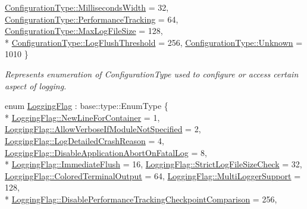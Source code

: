 \begin{DoxyCompactItemize}
\hyperlink{a00183_a281f5db6d6163678bc68a8b23b59e124a052bf0f0c813b3c41c5b5046ebc26529}{Configuration\+Type\+::\+Milliseconds\+Width} = 32, 
\hyperlink{a00183_a281f5db6d6163678bc68a8b23b59e124abe9e43d200c5698cb8519daed7035874}{Configuration\+Type\+::\+Performance\+Tracking} = 64, 
\hyperlink{a00183_a281f5db6d6163678bc68a8b23b59e124a4b35e615142d60db6383426f051e700b}{Configuration\+Type\+::\+Max\+Log\+File\+Size} = 128, 
\\*
\hyperlink{a00183_a281f5db6d6163678bc68a8b23b59e124ac1b4aae5c168e64292c9aa87a124ae86}{Configuration\+Type\+::\+Log\+Flush\+Threshold} = 256, 
\hyperlink{a00183_a281f5db6d6163678bc68a8b23b59e124a88183b946cc5f0e8c96b2e66e1c74a7e}{Configuration\+Type\+::\+Unknown} = 1010
 \}
\begin{DoxyCompactList}\small\item\em Represents enumeration of Configuration\+Type used to configure or access certain aspect of logging. \end{DoxyCompactList}\item 
enum \hyperlink{a00183_a2784aacd04cb7816ac1c0b20fcbf83cb}{Logging\+Flag} \+: base\+::type\+::\+Enum\+Type \{ \\*
\hyperlink{a00183_a2784aacd04cb7816ac1c0b20fcbf83cba8246f93d9afd63f87632d2d718cabca8}{Logging\+Flag\+::\+New\+Line\+For\+Container} = 1, 
\hyperlink{a00183_a2784aacd04cb7816ac1c0b20fcbf83cbac80d746c4296fe8e99ed032f5ffef31e}{Logging\+Flag\+::\+Allow\+Verbose\+If\+Module\+Not\+Specified} = 2, 
\hyperlink{a00183_a2784aacd04cb7816ac1c0b20fcbf83cba81ac37ef3ee37a01bf853be6abeb4ede}{Logging\+Flag\+::\+Log\+Detailed\+Crash\+Reason} = 4, 
\hyperlink{a00183_a2784aacd04cb7816ac1c0b20fcbf83cba8dd9782f8a19cf7a41e4ec38d1c6a4ae}{Logging\+Flag\+::\+Disable\+Application\+Abort\+On\+Fatal\+Log} = 8, 
\\*
\hyperlink{a00183_a2784aacd04cb7816ac1c0b20fcbf83cba7817e369fa619155822043e76ef88c7c}{Logging\+Flag\+::\+Immediate\+Flush} = 16, 
\hyperlink{a00183_a2784aacd04cb7816ac1c0b20fcbf83cba8496303f20ab09751ff3ec8802b187f5}{Logging\+Flag\+::\+Strict\+Log\+File\+Size\+Check} = 32, 
\hyperlink{a00183_a2784aacd04cb7816ac1c0b20fcbf83cbaeececaef2fc38e4f3c91f9f6b6fb6d49}{Logging\+Flag\+::\+Colored\+Terminal\+Output} = 64, 
\hyperlink{a00183_a2784aacd04cb7816ac1c0b20fcbf83cbaa2ce18adf399149a1b75bdafa773617e}{Logging\+Flag\+::\+Multi\+Logger\+Support} = 128, 
\\*
\hyperlink{a00183_a2784aacd04cb7816ac1c0b20fcbf83cba18ea5964e8caa7c476dd5eee8e4f74a0}{Logging\+Flag\+::\+Disable\+Performance\+Tracking\+Checkpoint\+Comparison} = 256, 

\end{DoxyCompactItemize}
